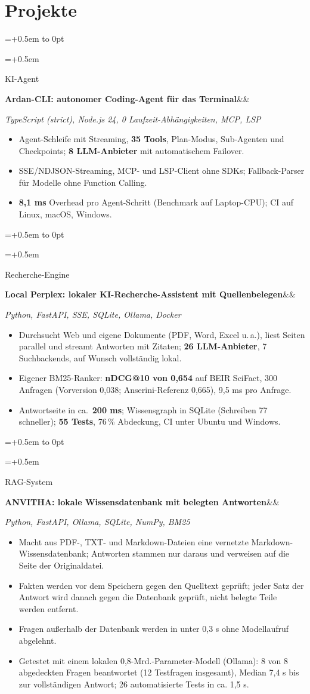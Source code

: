 \documentclass[10pt,a4paper]{article}
\newlength{\leftcol}\setlength{\leftcol}{2.45cm}
\newcommand{\gap}{0.5em}
\newcommand{\sep}{\hspace{0.45em}\textbar\hspace{0.45em}}
\newcommand{\entry}[3]{%
  \begingroup\raggedright\leftskip=\dimexpr\leftcol+\gap\relax\noindent
  \hspace*{-\dimexpr\leftcol+\gap\relax}%
  \vtop to 0pt{\hsize=\dimexpr\leftcol+\gap\relax\raggedright\small\color{mid}\noindent #1\par\vss}%
  #2\par #3\par\endgroup\vspace{4pt}}
\newcommand{\etitle}[2]{\textbf{#1}\ifx&#2&\else\textcolor{mid}{\sep}#2\fi}
\newcommand{\stack}[1]{{\small\itshape\color{mid}#1}\par\vspace{1pt}}
\begin{document}
\section*{Projekte}
\entry{KI-Agent}
  {\etitle{Ardan-CLI: autonomer Coding-Agent für das Terminal}{}}
  {\stack{TypeScript (strict), Node.js 24, 0 Laufzeit-Abhängigkeiten, MCP, LSP}
  \begin{itemize}
    \item Agent-Schleife mit Streaming, \textbf{35 Tools}, Plan-Modus, Sub-Agenten und Checkpoints; \textbf{8 LLM-Anbieter} mit automatischem Failover.
    \item SSE/NDJSON-Streaming, MCP- und LSP-Client ohne SDKs; Fallback-Parser für Modelle ohne Function Calling.
    \item \textbf{8,1 ms} Overhead pro Agent-Schritt (Benchmark auf Laptop-CPU); CI auf Linux, macOS, Windows.
  \end{itemize}}
\entry{Recherche-Engine}
  {\etitle{Local Perplex: lokaler KI-Recherche-Assistent mit Quellenbelegen}{}}
  {\stack{Python, FastAPI, SSE, SQLite, Ollama, Docker}
  \begin{itemize}
    \item Durchsucht Web und eigene Dokumente (PDF, Word, Excel u.\,a.), liest Seiten parallel und streamt Antworten mit Zitaten; \textbf{26 LLM-Anbieter}, 7 Suchbackends, auf Wunsch vollständig lokal.
    \item Eigener BM25-Ranker: \textbf{nDCG@10 von 0,654} auf BEIR SciFact, 300 Anfragen (Vorversion 0,038; Anserini-Referenz 0,665), 9,5 ms pro Anfrage.
    \item Antwortseite in ca.\ \textbf{200 ms}; Wissensgraph in SQLite (Schreiben 77\texttimes{} schneller); \textbf{55 Tests}, 76\,\% Abdeckung, CI unter Ubuntu und Windows.
  \end{itemize}}
\entry{RAG-System}
  {\etitle{ANVITHA: lokale Wissensdatenbank mit belegten Antworten}{}}
  {\stack{Python, FastAPI, Ollama, SQLite, NumPy, BM25}
  \begin{itemize}
    \item Macht aus PDF-, TXT- und Markdown-Dateien eine vernetzte Markdown-Wissensdatenbank; Antworten stammen nur daraus und verweisen auf die Seite der Originaldatei.
    \item Fakten werden vor dem Speichern gegen den Quelltext geprüft; jeder Satz der Antwort wird danach gegen die Datenbank geprüft, nicht belegte Teile werden entfernt.
    \item Fragen außerhalb der Datenbank werden in unter 0,3 s ohne Modellaufruf abgelehnt.
    \item Getestet mit einem lokalen 0,8-Mrd.-Parameter-Modell (Ollama): 8 von 8 abgedeckten Fragen beantwortet (12 Testfragen insgesamt), Median 7,4 s bis zur vollständigen Antwort; 26 automatisierte Tests in ca. 1,5 s.
  \end{itemize}}
\end{document}
